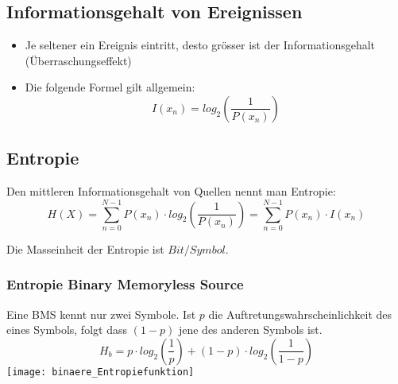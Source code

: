 \subsection{Informationsgehalt von Ereignissen}
\begin{itemize}
    \item Je seltener ein Ereignis eintritt, desto grösser ist der
    Informationsgehalt (Überraschungseffekt)
    \item Die folgende Formel gilt allgemein:
    \begin{equation*}
        I(x_n) = log_2(\frac{1}{P(x_n)})
    \end{equation*}
\end{itemize}
\subsection{Entropie}
Den mittleren Informationsgehalt von Quellen nennt man Entropie:
\begin{equation*}
    H(X) = \sum_{n=0}^{N-1} P(x_n) \cdot log_2(\frac{1}{P(x_n)}) = \sum_{n=0}^{N-1} P(x_n) \cdot I(x_n)
\end{equation*}

Die Masseinheit der Entropie ist $Bit/Symbol$.
\subsubsection{Entropie Binary Memoryless Source}
Eine BMS kennt nur zwei Symbole. Ist $p$ die Auftretungswahrscheinlichkeit des eines Symbols, folgt dass $(1-p)$ jene des anderen Symbols ist.
\begin{equation*}
    H_b = p  \cdot log_2(\frac{1}{p}) + (1-p)  \cdot log_2(\frac{1}{1-p})
\end{equation*}
\texttt{[image: binaere\_Entropiefunktion]}